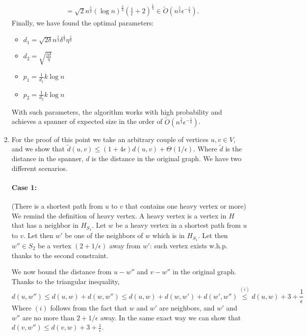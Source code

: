 \documentclass[11pt]{article}
\begin{document}
\begin{enumerate}
\begin{align*}
        & = \sqrt{2}n^{\frac{5}{4}}\left(\log n\right)^{\frac{3}{4}}\left(\frac{1}{\epsilon}+2\right)^{\frac{1}{4}} \in \tilde O \left(n^{\frac{5}{4}}\epsilon^{-\frac{1}{4}}\right).
    \end{align*}
    Finally, we have found the optimal parameters:
    \begin{itemize}
        \item $d_1 = \sqrt{2\delta} n^{\frac{1}{4}}\delta^{\frac{1}{4}}\eta^{\frac{1}{4}}$
        \item $d_2 = \sqrt{\frac{n\delta}{\eta}}$
        \item $p_1 = \frac{1}{d_1}k\log n$
        \item $p_2 = \frac{1}{d_2}k\log n$
    \end{itemize}
    With such parameters, the algorithm works with high probability and achieves a spanner of expected size in the order of $\tilde O \left(n^{\frac{5}{4}}\epsilon^{-\frac{1}{4}}\right)$.
    \item For the proof of this point we take an arbitrary couple of vertices $u,v \in V$, and we show that $\tilde d(u,v) \leq (1+4\epsilon)d(u,v) + \Theta(1/\epsilon)$. Where $\tilde d$ is the distance in the spanner, $d$ is the distance in the original graph. We have two different scenarios.
    \paragraph{Case 1:} (There is a shortest path from $u$ to $v$ that contains one heavy vertex or more)
    We remind the definition of heavy vertex. A heavy vertex is a vertex in $H$ that has a neighbor in $H_{S_1}$. Let $w$ be a heavy vertex in a shortest path from $u$ to $v$. Let then $w'$ be one of the neighbors of $w$ which is in $H_{S_1}$. Let then $w'' \in S_2$ be a vertex $(2+1/\epsilon)$ away from $w'$: such vertex exists w.h.p. thanks to the second constraint.

    We now bound the distance from $u-w''$ and $v-w''$ in the original graph. Thanks to the triangular inequality,
    \begin{equation*}
        d(u,w'') \leq d(u,w) + d(w,w'') \leq d(u,w) +d(w,w') + d(w',w'') \stackrel{(i)}{\leq} d(u,w) + 3 + \frac{1}{\epsilon}
    \end{equation*}
    Where $(i)$ follows from the fact that $w$ and $w'$ are neighbors, and $w'$ and $w''$ are no more than $2+1/\epsilon$ away. In the same exact way we can show that $d(v,w'') \leq d(v,w) + 3 + \frac{1}{\epsilon}$. 


\end{enumerate}
\end{document}
